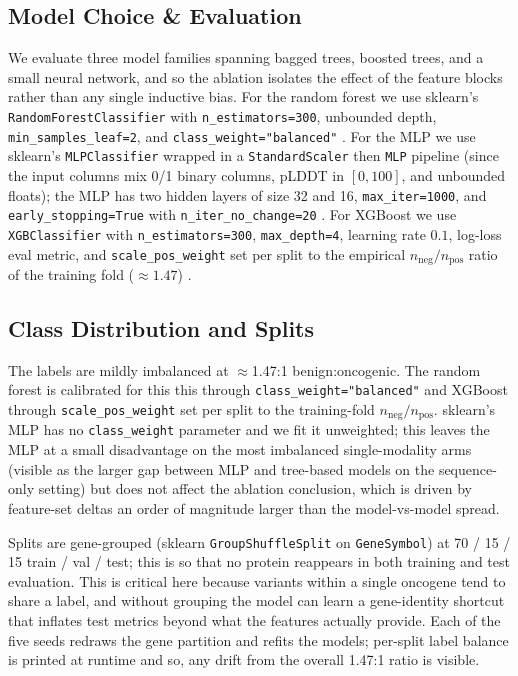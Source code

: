 \documentclass{article}
\begin{document}
\subsection{Model Choice \& Evaluation}
We evaluate three model families spanning bagged trees, boosted trees,
and a small neural network, and so the ablation isolates the effect of the
feature blocks rather than any single inductive bias. For the random
forest we use sklearn's \texttt{RandomForestClassifier} with
\texttt{n\_estimators=300}, unbounded depth, \texttt{min\_samples\_leaf=2},
and \texttt{class\_weight="balanced"} \citep{pedregosa2011sklearn}. For
the MLP we use sklearn's \texttt{MLPClassifier} wrapped in a
\texttt{StandardScaler} then \texttt{MLP} pipeline (since the input columns mix
0/1 binary columns, pLDDT in $[0, 100]$, and unbounded floats); the MLP has
two hidden layers of size 32 and 16, \texttt{max\_iter=1000}, and
\texttt{early\_stopping=True} with \texttt{n\_iter\_no\_change=20}
\citep{pedregosa2011sklearn}. For XGBoost we use \texttt{XGBClassifier}
with \texttt{n\_estimators=300}, \texttt{max\_depth=4}, learning rate
$0.1$, log-loss eval metric, and \texttt{scale\_pos\_weight} set per
split to the empirical $n_{\text{neg}} / n_{\text{pos}}$ ratio of the
training fold ($\approx 1.47$) \citep{chen2016xgboost}.

\subsection{Class Distribution and Splits}
The labels are mildly imbalanced at $\approx$1.47:1 benign:oncogenic.
The random forest is calibrated for this this through
\texttt{class\_weight="balanced"} and XGBoost through
\texttt{scale\_pos\_weight} set per split to the training-fold
$n_{\text{neg}} / n_{\text{pos}}$. sklearn's MLP has no
\texttt{class\_weight} parameter and we fit it unweighted; this leaves
the MLP at a small disadvantage on the most imbalanced single-modality
arms (visible as the larger gap between MLP and tree-based models on
the sequence-only setting) but does not affect the ablation
conclusion, which is driven by feature-set deltas an order of magnitude
larger than the model-vs-model spread.

Splits are gene-grouped (sklearn \texttt{GroupShuffleSplit} on
\texttt{GeneSymbol}) at 70 / 15 / 15 train / val / test; this is so that no protein
reappears in both training and test evaluation. This is critical here
because variants within a single oncogene tend to share a label, and
without grouping the model can learn a gene-identity shortcut that
inflates test metrics beyond what the features actually provide. Each of
the five seeds redraws the gene partition and refits the models;
per-split label balance is printed at runtime and so, any drift from the
overall 1.47:1 ratio is visible.
\end{document}
